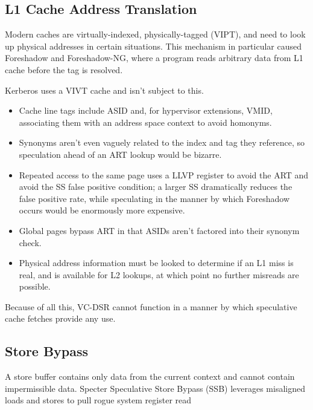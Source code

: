 \subsection{L1 Cache Address Translation}

Modern caches are virtually-indexed, physically-tagged (VIPT), and need to look
up physical addresses in certain situations.  This mechanism in particular
caused Foreshadow and Foreshadow-NG, where a program reads arbitrary data from
L1 cache before the tag is resolved.

Kerberos uses a VIVT cache and isn't subject to this.

\begin{itemize}

    \item Cache line tags include ASID and, for hypervisor extensions, VMID,
        associating them with an address space context to avoid homonyms.

    \item Synonyms aren't even vaguely related to the index and tag they
        reference, so speculation ahead of an ART lookup would be bizarre.

    \item Repeated access to the same page uses a LLVP register to avoid the
        ART and avoid the SS false positive condition; a larger SS dramatically
        reduces the false positive rate, while speculating in the manner by
        which Foreshadow occurs would be enormously more expensive.

    \item Global pages bypass ART in that ASIDs aren't factored into their
        synonym check.

    \item Physical address information must be looked to determine if an L1
        miss is real, and is available for L2 lookups, at which point no
        further misreads are possible.

\end{itemize}

Because of all this, VC-DSR cannot function in a manner by which speculative
cache fetches provide any use.

\subsection{Store Bypass}

A store buffer contains only data from the current context and cannot contain
impermissible data.  Specter Speculative Store Bypass (SSB) leverages
misaligned loads and stores to pull
rogue system register read

